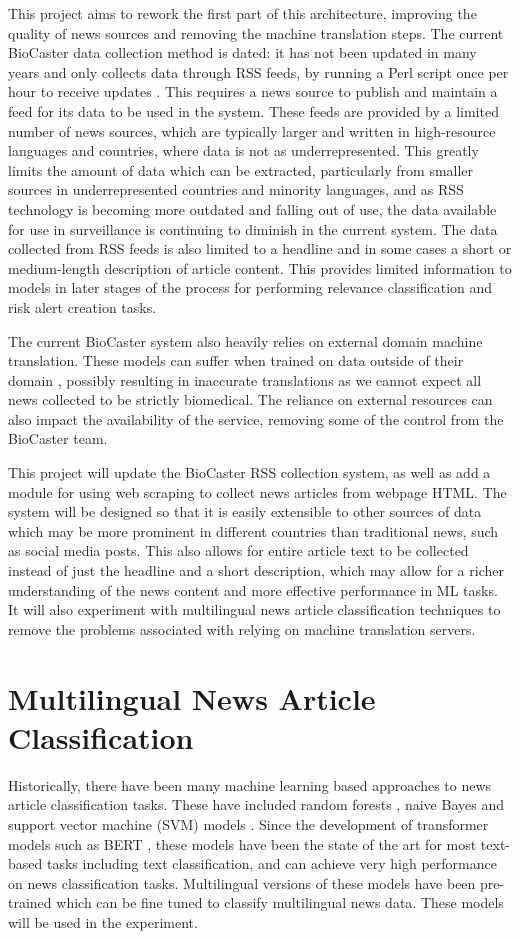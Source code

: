 \documentclass{l4proj}
\begin{document}
This project aims to rework the first part of this architecture, improving the quality of news sources and removing the machine translation steps. The current BioCaster data collection method is dated: it has not been updated in many years and only collects data through RSS feeds, by running a Perl script once per hour to receive updates \citep{collier2008biocaster}. This requires a news source to publish and maintain a feed for its data to be used in the system. These feeds are provided by a limited number of news sources, which are typically larger and written in high-resource languages and countries, where data is not as underrepresented. This greatly limits the amount of data which can be extracted, particularly from smaller sources in underrepresented countries and minority languages, and as RSS technology is becoming more outdated and falling out of use, the data available for use in surveillance is continuing to diminish in the current system. The data collected from RSS feeds is also limited to a headline and in some cases a short or medium-length description of article content. This provides limited information to models in later stages of the process for performing relevance classification and risk alert creation tasks. \par
The current BioCaster system also heavily relies on external domain machine translation. These models can suffer when trained on data outside of their domain \citep{koehn2017six}, possibly resulting in inaccurate translations as we cannot expect all news collected to be strictly biomedical. The reliance on external resources can also impact the availability of the service, removing some of the control from the BioCaster team. \par
This project will update the BioCaster RSS collection system, as well as add a module for using web scraping to collect news articles from webpage HTML. The system will be designed so that it is easily extensible to other sources of data which may be more prominent in different countries than traditional news, such as social media posts. This also allows for entire article text to be collected instead of just the headline and a short description, which may allow for a richer understanding of the news content and more effective performance in ML tasks. It will also experiment with multilingual news article classification techniques to remove the problems associated with relying on machine translation servers.

\section{Multilingual News Article Classification}
Historically, there have been many machine learning based approaches to news article classification tasks. These have included random forests \citep{liparas2014news}, naive Bayes and support vector machine (SVM) models \citep{kaur2016news}. Since the development of transformer models such as BERT \citep{devlin2018bert}, these models have been the state of the art for most text-based tasks including text classification, and can achieve very high performance on news classification tasks. Multilingual versions of these models have been pre-trained which can be fine tuned to classify multilingual news data. These models will be used in the experiment.
\end{document}
